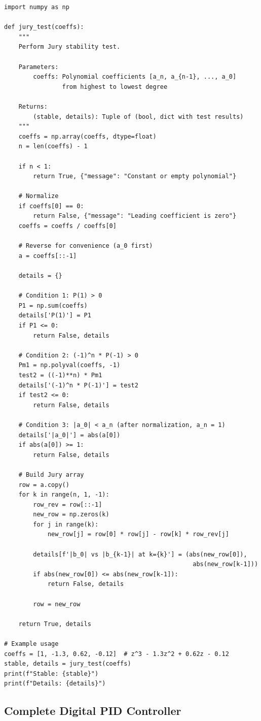\begin{verbatim}
import numpy as np

def jury_test(coeffs):
    """
    Perform Jury stability test.

    Parameters:
        coeffs: Polynomial coefficients [a_n, a_{n-1}, ..., a_0]
                from highest to lowest degree

    Returns:
        (stable, details): Tuple of (bool, dict with test results)
    """
    coeffs = np.array(coeffs, dtype=float)
    n = len(coeffs) - 1

    if n < 1:
        return True, {"message": "Constant or empty polynomial"}

    # Normalize
    if coeffs[0] == 0:
        return False, {"message": "Leading coefficient is zero"}
    coeffs = coeffs / coeffs[0]

    # Reverse for convenience (a_0 first)
    a = coeffs[::-1]

    details = {}

    # Condition 1: P(1) > 0
    P1 = np.sum(coeffs)
    details['P(1)'] = P1
    if P1 <= 0:
        return False, details

    # Condition 2: (-1)^n * P(-1) > 0
    Pm1 = np.polyval(coeffs, -1)
    test2 = ((-1)**n) * Pm1
    details['(-1)^n * P(-1)'] = test2
    if test2 <= 0:
        return False, details

    # Condition 3: |a_0| < a_n (after normalization, a_n = 1)
    details['|a_0|'] = abs(a[0])
    if abs(a[0]) >= 1:
        return False, details

    # Build Jury array
    row = a.copy()
    for k in range(n, 1, -1):
        row_rev = row[::-1]
        new_row = np.zeros(k)
        for j in range(k):
            new_row[j] = row[0] * row[j] - row[k] * row_rev[j]

        details[f'|b_0| vs |b_{k-1}| at k={k}'] = (abs(new_row[0]),
                                                    abs(new_row[k-1]))
        if abs(new_row[0]) <= abs(new_row[k-1]):
            return False, details

        row = new_row

    return True, details

# Example usage
coeffs = [1, -1.3, 0.62, -0.12]  # z^3 - 1.3z^2 + 0.62z - 0.12
stable, details = jury_test(coeffs)
print(f"Stable: {stable}")
print(f"Details: {details}")
\end{verbatim}

\subsection{Complete Digital PID Controller}

